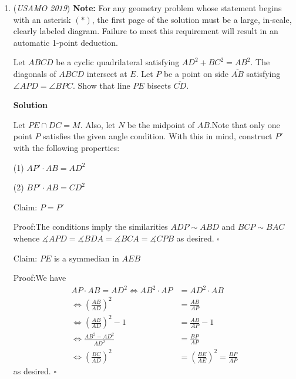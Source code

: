 \begin{enumerate}
 $(2) f^{f(m)}(m)=k<m$, also contradicted by Lemma 1 by similar logic.

 $(3) f^2(m)=m$ and $f^{f(m)}(m)=m$, which implies that $f(m)=m$ by Lemma 2.This proves the claim.

 
By injectivity, $f(1000)$ is not odd.I will prove that $f(1000)$ can be any even number, $x$. Let $f(1000)=x, f(x)=1000$, and $f(k)=k$ for all other $k$. If $n$ is equal to neither $1000$ nor $x$, then $f^2(n)\cdot f^{f(n)}(n)=n\cdot n=n^2$. This satisfies the given property.

 If $n$ is equal to $1000$ or $x$, then $f^2(n)\cdot f^{f(n)}(n)=n\cdot n=n^2$ since $f(n)$ is even and $f^2(n)=n$. This satisfies the given property.

 


 


 


	\item (\textit{USAMO 2019}) \textbf{Note:} For any geometry problem whose statement begins with an asterisk $(*)$, the first page of the solution must be a large, in-scale, clearly labeled diagram. Failure to meet this requirement will result in an automatic 1-point deduction.


 Let $ABCD$ be a cyclic quadrilateral satisfying $AD^2 + BC^2 = AB^2$. The diagonals of $ABCD$ intersect at $E$. Let $P$ be a point on side $\overline{AB}$ satisfying $\angle APD = \angle BPC$. Show that line $PE$ bisects $\overline{CD}$.


 



\textbf{Solution}

Let $PE \cap DC = M$. Also, let $N$ be the midpoint of $AB$.Note that only one point $P$ satisfies the given angle condition. With this in mind, construct $P'$ with the following properties:

 (1) $AP' \cdot AB = AD^2$

 (2) $BP' \cdot AB = CD^2$

 Claim: $P = P'$

 Proof:The conditions imply the similarities $ADP \sim ABD$ and $BCP \sim BAC$ whence $\measuredangle APD = \measuredangle BDA = \measuredangle BCA = \measuredangle CPB$ as desired. $\square$

 Claim: $PE$ is a symmedian in $AEB$

 Proof:We have 
 \begin{align*}  AP \cdot AB = AD^2 \iff AB^2 \cdot AP &= AD^2 \cdot AB \\ \iff \left( \frac{AB}{AD} \right)^2 &= \frac{AB}{AP} \\ \iff \left( \frac{AB}{AD} \right)^2 - 1 &= \frac{AB}{AP} - 1 \\ \iff \frac{AB^2 - AD^2}{AD^2} &= \frac{BP}{AP} \\ \iff \left(\frac{BC}{AD} \right)^2 &= \left(\frac{BE}{AE} \right)^2 = \frac{BP}{AP}  \end{align*}
as desired. $\square$


\end{enumerate}
